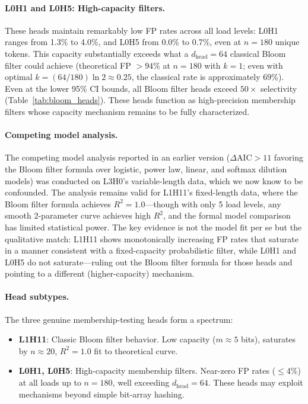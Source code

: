 \documentclass[11pt]{article}
\begin{document}
\paragraph{L0H1 and L0H5: High-capacity filters.} These heads maintain remarkably low FP rates across all load levels: L0H1 ranges from 1.3\% to 4.0\%, and L0H5 from 0.0\% to 0.7\%, even at $n = 180$ unique tokens. This capacity substantially exceeds what a $d_\text{head} = 64$ classical Bloom filter could achieve (theoretical FP $> 94\%$ at $n = 180$ with $k = 1$; even with optimal $k = (64/180)\ln 2 \approx 0.25$, the classical rate is approximately 69\%). Even at the lower 95\% CI bounds, all Bloom filter heads exceed $50\times$ selectivity (Table~\ref{tab:bloom_heads}). These heads function as high-precision membership filters whose capacity mechanism remains to be fully characterized.

\paragraph{Competing model analysis.} The competing model analysis reported in an earlier version ($\Delta\text{AIC} > 11$ favoring the Bloom filter formula over logistic, power law, linear, and softmax dilution models) was conducted on L3H0's variable-length data, which we now know to be confounded. The analysis remains valid for L1H11's fixed-length data, where the Bloom filter formula achieves $R^2 = 1.0$---though with only 5 load levels, any smooth 2-parameter curve achieves high $R^2$, and the formal model comparison has limited statistical power. The key evidence is not the model fit per se but the qualitative match: L1H11 shows monotonically increasing FP rates that saturate in a manner consistent with a fixed-capacity probabilistic filter, while L0H1 and L0H5 do not saturate---ruling out the Bloom filter formula for those heads and pointing to a different (higher-capacity) mechanism.

\paragraph{Head subtypes.} The three genuine membership-testing heads form a spectrum:

\begin{itemize}
    \item \textbf{L1H11}: Classic Bloom filter behavior. Low capacity ($m \approx 5$ bits), saturates by $n \approx 20$, $R^2 = 1.0$ fit to theoretical curve.
    \item \textbf{L0H1, L0H5}: High-capacity membership filters. Near-zero FP rates ($\leq$4\%) at all loads up to $n = 180$, well exceeding $d_\text{head} = 64$. These heads may exploit mechanisms beyond simple bit-array hashing.
\end{itemize}
\end{document}
